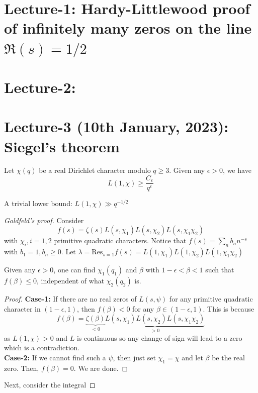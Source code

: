 \documentclass[oneside, 12pt, ]{scrbook}
\theoremstyle{theorem}
\begin{document}
\chapter{Lecture-1: Hardy-Littlewood proof of infinitely many zeros on the line $\mathfrak{R}(s) = 1/2$}

\chapter{Lecture-2: }

\chapter{Lecture-3 (10th January, 2023): Siegel's theorem }

\begin{theorem}[Siegel]
Let $\chi(q)$ be a real Dirichlet character modulo $q\geq 3$. Given any $\epsilon >0$, we have $$L(1, \chi) \geq \frac{C_{\epsilon}}{q^{\epsilon}}$$
\end{theorem}

A trivial lower bound: $L(1, \chi) \gg q^{-1/2}$

\begin{proof}[Goldfeld's proof]
Consider $$f(s) = \zeta(s)L(s,\chi_{1})L(s,\chi_{2})L(s,\chi_{1}\chi_{2})$$ with $\chi_{i}, i=1,2$ primitive quadratic characters. Notice that $f(s) = \sum_{n} b_{n}n^{-s}$ with $b_{1} =1 , b_{n} \geq 0$. Let $\lambda = \mathrm{Res}_{s=1}f(s) = L(1,\chi_{1})L(1,\chi_{2})L(1,\chi_{1}\chi_{2})$

\begin{lemma}
Given any $\epsilon >0$, one can find $\chi_{1}(q_{1})$ and $\beta$ with $1-\epsilon < \beta < 1$ such that $f(\beta) \le 0$, independent of what $\chi_{2}(q_{2})$ is. 
\end{lemma}

\begin{proof}
\textbf{Case-1:} If there are no real zeros of $L(s, \psi)$ for any primitive quadratic character in $(1-\epsilon,1)$, then $f(\beta) < 0$ for any $\beta \in (1 - \epsilon,1)$. This is because $$f(\beta) = \underbrace{\zeta(\beta)}_{<0} \underbrace{L(s,\chi_{1})L(s,\chi_{2})L(s,\chi_{1}\chi_{2})}_{>0}$$ as $L(1,\chi)>0$ and $L$ is continuous so any change of sign will lead to a zero which is a contradiction. \\
\textbf{Case-2:} If we cannot find such a $\psi$, then just set $\chi_{1}=\chi$ and let $\beta$ be the real zero. Then, $f(\beta)=0$. We are done. 
\end{proof}

Next, consider the integral 

\end{proof}
\end{document}
